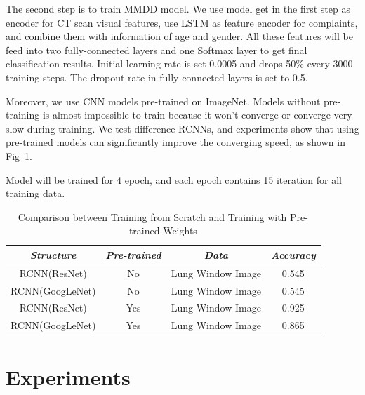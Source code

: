 \documentclass[journal]{IEEEtran}
\begin{document}
The second step is to train MMDD model. We use model get in the first step as encoder for CT scan visual features, use LSTM as feature encoder for complaints, and combine them with information of age and gender. All these features will be feed into two fully-connected layers and one Softmax layer to get final classification results. Initial learning rate is set 0.0005 and drops 50\% every 3000 training steps. The dropout rate in fully-connected layers is set to 0.5.

Moreover, we use CNN models pre-trained on ImageNet\cite{ILSVRC15}. Models without pre-training is almost impossible to train because it won't converge or converge very slow during training. We test difference RCNNs, and experiments show that using pre-trained models can significantly improve the converging speed, as shown in Fig~\ref{pretrain}.

Model will be trained for 4 epoch, and each epoch contains 15 iteration for all training data.

\begin{table}[htb]
    \vspace{-0cm}
    \caption{Comparison between Training from Scratch and Training with Pre-trained Weights}
    \vspace{-0cm}
    \begin{center}
        \begin{tabular}{|c|c|c|c|}
        \hline
        \textbf{\textit{Structure}} & \textbf{\textit{Pre-trained}} & \textbf{\textit{Data}}& \textbf{\textit{Accuracy}}  \\
        \hline
        RCNN(ResNet) &No & Lung Window Image & 0.545\\
        RCNN(GoogLeNet) & No & Lung Window Image & 0.545\\
        RCNN(ResNet) & Yes & Lung Window Image & 0.925\\
        RCNN(GoogLeNet) & Yes & Lung Window Image & 0.865\\
        
        \hline
        \end{tabular}
    \vspace{-0cm}
    \label{pretrain}
    \end{center}
    \vspace{-0cm}
    \end{table}


\section{Experiments}
\label{experiments}
\end{document}
